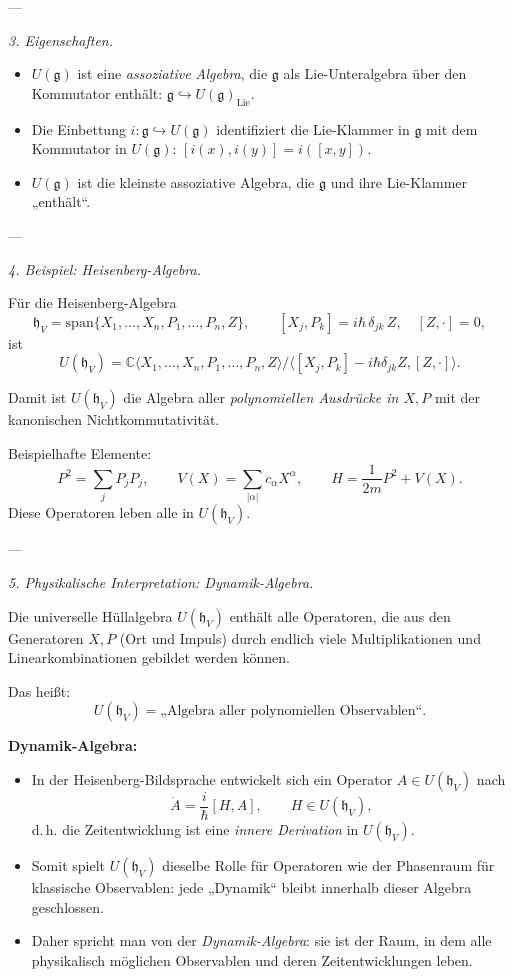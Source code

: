 \documentclass[10pt, letterpaper]{article}
\newcommand{\C}{\mathbb{C}}
\begin{document}
---

\emph{3. Eigenschaften.}

\begin{itemize}
\item \(U(\mathfrak{g})\) ist eine \emph{assoziative Algebra}, die \(\mathfrak{g}\)
      als Lie-Unteralgebra über den Kommutator enthält:
      \(\mathfrak{g}\hookrightarrow U(\mathfrak{g})_{\mathrm{Lie}}\).
\item Die Einbettung \(i:\mathfrak{g}\hookrightarrow U(\mathfrak{g})\)
      identifiziert die Lie-Klammer in \(\mathfrak{g}\)
      mit dem Kommutator in \(U(\mathfrak{g})\):
      \([i(x),i(y)] = i([x,y])\).
\item \(U(\mathfrak{g})\) ist die kleinste assoziative Algebra, die \(\mathfrak{g}\) und ihre Lie-Klammer „enthält“.
\end{itemize}

---

\emph{4. Beispiel: Heisenberg-Algebra.}

Für die Heisenberg-Algebra
\[
\mathfrak{h}_V = \mathrm{span}\{X_1,\ldots,X_n,P_1,\ldots,P_n,Z\},\qquad
[X_j,P_k]=i\hbar\,\delta_{jk}\,Z,\quad [Z,\cdot]=0,
\]
ist
\[
U(\mathfrak{h}_V)
= \C\langle X_1,\ldots,X_n,P_1,\ldots,P_n,Z\rangle
\big/
\langle [X_j,P_k]-i\hbar\delta_{jk}Z, [Z,\cdot] \rangle.
\]

Damit ist \(U(\mathfrak{h}_V)\) die Algebra aller \emph{polynomiellen Ausdrücke in \(X,P\)} mit der kanonischen Nichtkommutativität.

Beispielhafte Elemente:
\[
P^2 = \sum_j P_jP_j,\qquad
V(X)=\sum_{|\alpha|}c_\alpha X^\alpha,\qquad
H = \frac{1}{2m}P^2 + V(X).
\]
Diese Operatoren leben alle in \(U(\mathfrak{h}_V)\).

---

\emph{5. Physikalische Interpretation: Dynamik-Algebra.}

Die universelle Hüllalgebra \(U(\mathfrak{h}_V)\) enthält alle Operatoren,
die aus den Generatoren \(X,P\) (Ort und Impuls)
durch endlich viele Multiplikationen und Linearkombinationen gebildet werden können.

Das heißt:
\[
U(\mathfrak{h}_V)
=\text{„Algebra aller polynomiellen Observablen“}.
\]

\textbf{Dynamik-Algebra:}
\begin{itemize}
\item In der Heisenberg-Bildsprache entwickelt sich ein Operator \(A\in U(\mathfrak{h}_V)\) nach
      \[
      \dot{A} = \frac{i}{\hbar}[H,A],\qquad H\in U(\mathfrak{h}_V),
      \]
      d.\,h. die Zeitentwicklung ist eine \emph{innere Derivation} in \(U(\mathfrak{h}_V)\).
\item Somit spielt \(U(\mathfrak{h}_V)\) dieselbe Rolle für Operatoren wie der Phasenraum für klassische Observablen:
      jede „Dynamik“ bleibt innerhalb dieser Algebra geschlossen.
\item Daher spricht man von der \emph{Dynamik-Algebra}:
      sie ist der Raum, in dem alle physikalisch möglichen Observablen und deren Zeitentwicklungen leben.
\end{itemize}
\end{document}

